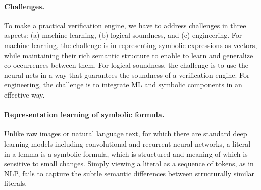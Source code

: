 



\paragraph{Challenges.}
To make \dpy a practical verification engine, we have to address challenges in
three aspects: (a) machine learning, (b) logical soundness, and (c) engineering. For
machine learning, the challenge is in representing symbolic expressions as
vectors, while maintaining their rich semantic structure to enable to learn and
generalize co-occurrences between them. For logical soundness, the challenge is to use the neural nets
in a way that guarantees the soundness of a verification engine.
For engineering, the challenge is to
integrate ML and symbolic components in an effective way.

\paragraph{Representation learning of symbolic formula.}
Unlike raw images or natural language text, for which there are standard deep
learning models including convolutional and recurrent neural networks, a literal
in a lemma is a symbolic formula, which is structured and meaning of which is
sensitive to small changes. Simply viewing a literal as a sequence of tokens, as
in NLP, fails to capture the subtle semantic differences between structurally
similar literals.
    
